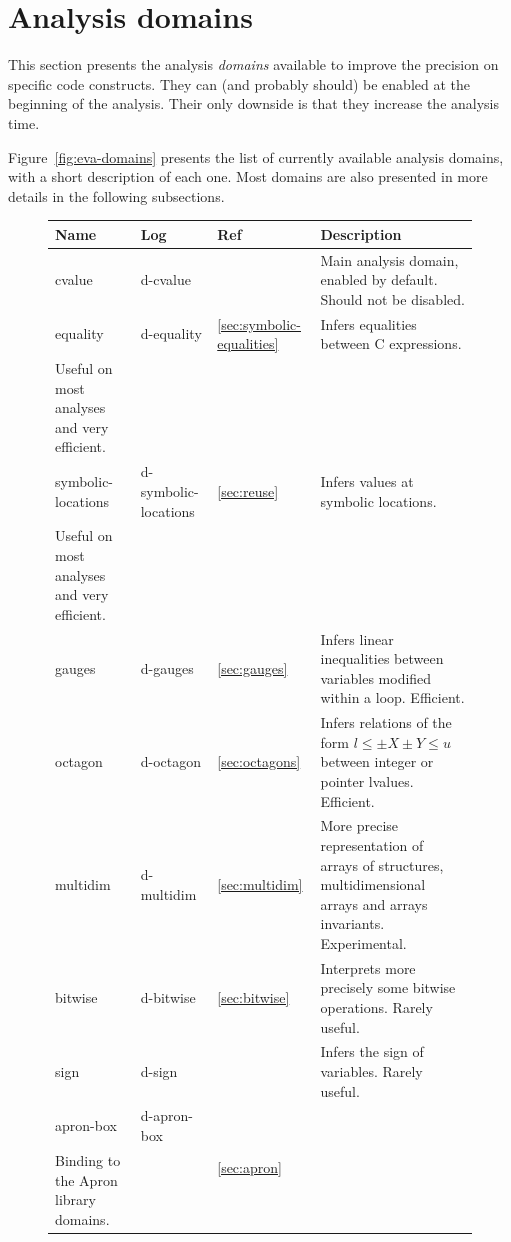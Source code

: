 \documentclass{frama-c-book}
\begin{document}
\section{Analysis domains}
\label{sec:eva}

This section presents the analysis \emph{domains}
available to improve the precision on specific code constructs.
They can (and probably should) be enabled at the beginning of the analysis.
Their only downside is that they increase the analysis time.

Figure~\ref{fig:eva-domains} presents the list of currently available analysis
domains, with a short description of each one.
Most domains are also presented in more details in the following subsections.

\begin{figure}
  \begin{tabular}{lll>{\raggedright}m{7.5cm}}
    Name & Log & Ref & Description\tabularnewline
    \midrule
    \midrule
    cvalue & d-cvalue &  &
    Main analysis domain, enabled by default. Should not be disabled.
    \tabularnewline
    \midrule
    equality & d-equality & \ref{sec:symbolic-equalities} &
    Infers equalities between C expressions. \\
    Useful on most analyses and very efficient.
    \tabularnewline
    \midrule
    symbolic-locations & d-symbolic-locations & \ref{sec:reuse} &
    Infers values at symbolic locations. \\
    Useful on most analyses and very efficient.
    \tabularnewline
    \midrule
    gauges & d-gauges & \ref{sec:gauges} &
    Infers linear inequalities between variables modified within a loop. Efficient.
    \tabularnewline
    \midrule
    octagon & d-octagon & \ref{sec:octagons} &
    Infers relations of the form $l \leq \pm X \pm Y \leq u$ between integer or
    pointer lvalues. Efficient.
    \tabularnewline
    \midrule
    multidim & d-multidim & \ref{sec:multidim} &
    More precise representation of arrays of structures,
    multidimensional arrays and arrays invariants.
    Experimental.
    \tabularnewline
    \midrule
    bitwise & d-bitwise & \ref{sec:bitwise} &
    Interprets more precisely some bitwise operations. Rarely useful.
    \tabularnewline
    \midrule
    sign & d-sign &  &
    Infers the sign of variables. Rarely useful.
    \tabularnewline
    \midrule
    apron-box & d-apron-box & \multirow{5}{*}{\ref{sec:apron}} &
    \multirow{5}{7.5cm}{Experimental and often costly. \\
      Binding to the Apron library domains.}\tabularnewline

\end{tabular}
\end{figure}
\end{document}
